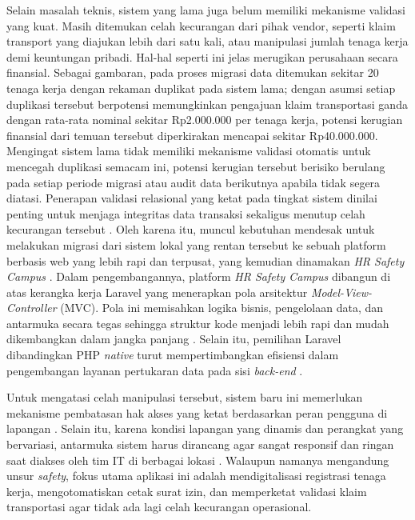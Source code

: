 Selain masalah teknis, sistem yang lama juga belum memiliki mekanisme validasi
yang kuat. Masih ditemukan celah kecurangan dari pihak vendor, seperti klaim
transport yang diajukan lebih dari satu kali, atau manipulasi jumlah tenaga kerja
demi keuntungan pribadi. Hal-hal seperti ini jelas merugikan perusahaan secara
finansial. Sebagai gambaran, pada proses migrasi data ditemukan sekitar 20
tenaga kerja dengan rekaman duplikat pada sistem lama; dengan asumsi setiap
duplikasi tersebut berpotensi memungkinkan pengajuan klaim transportasi ganda
dengan rata-rata nominal sekitar Rp2.000.000 per tenaga kerja, potensi kerugian
finansial dari temuan tersebut diperkirakan mencapai sekitar Rp40.000.000.
Mengingat sistem lama tidak memiliki mekanisme validasi otomatis untuk mencegah
duplikasi semacam ini, potensi kerugian tersebut berisiko berulang pada setiap
periode migrasi atau audit data berikutnya apabila tidak segera diatasi.
Penerapan validasi relasional yang ketat pada tingkat sistem dinilai penting
untuk menjaga integritas data transaksi sekaligus menutup celah kecurangan
tersebut \cite{zulkarnain2026validasi}.
Oleh karena itu, muncul kebutuhan mendesak untuk melakukan migrasi
dari sistem lokal yang rentan tersebut ke sebuah platform berbasis web yang lebih
rapi dan terpusat, yang kemudian dinamakan \textit{HR Safety Campus}
\cite{susanti2025hris}.
Dalam pengembangannya, platform \textit{HR Safety Campus} dibangun di atas
kerangka kerja Laravel yang menerapkan pola arsitektur
\textit{Model-View-Controller} (MVC). Pola ini memisahkan logika bisnis,
pengelolaan data, dan antarmuka secara tegas sehingga struktur kode menjadi
lebih rapi dan mudah dikembangkan dalam jangka panjang \cite{rahmawati2024mvc}.
Selain itu, pemilihan Laravel dibandingkan PHP \textit{native} turut
mempertimbangkan efisiensi dalam pengembangan layanan pertukaran data pada sisi
\textit{back-end} \cite{ariyanto2024restapi}.
 
Untuk mengatasi celah manipulasi tersebut, sistem baru ini memerlukan mekanisme
pembatasan hak akses yang ketat berdasarkan peran pengguna di lapangan
\cite{mary2025rbac, yuricha2023rbac}. Selain itu, karena kondisi lapangan yang dinamis dan
perangkat yang bervariasi, antarmuka sistem harus dirancang agar sangat responsif
dan ringan saat diakses oleh tim IT di berbagai lokasi \cite{nandan2024tailwind}.
Walaupun namanya mengandung unsur \textit{safety}, fokus utama aplikasi ini
adalah mendigitalisasi registrasi tenaga kerja, mengotomatiskan cetak surat izin,
dan memperketat validasi klaim transportasi agar tidak ada lagi celah kecurangan
operasional.
 
